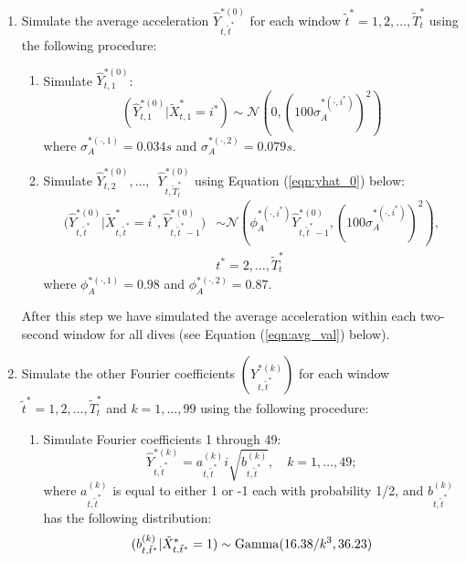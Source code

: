\begin{enumerate}
\item Simulate the average acceleration $\hat Y^{*(0)}_{t,\tilde t^*}$ for each window $\tilde t^* = 1,2,\ldots,\tilde T^*_t$ using the following procedure:
\begin{enumerate}
    \item Simulate $\hat{Y}^{*(0)}_{t,1}$:
    $$
    	(\hat{Y}^{*(0)}_{t,1}|\tilde X^*_{t,1} = i^*) \sim \mathcal{N} \left(0, \left(100\sigma_A^{*(\cdot,i^*)}\right)^2 \right)
    $$
    where $\sigma_A^{*(\cdot,1)} = 0.034s$ and $\sigma_A^{*(\cdot,2)} = 0.079s$. 
    \item Simulate $\hat{Y}^{*(0)}_{t,2}, \ldots,\enspace \hat{Y}^{*(0)}_{t,\tilde T^*_t}$ using Equation (\ref{eqn:yhat_0}) below:
    \begin{align}	
        \Big(\hat{Y}^{*(0)}_{t,\tilde t^*}|\tilde X^*_{t,\tilde t^*} = i^*,\hat{Y}^{*(0)}_{t,\tilde t^*-1}\Big) &\sim \mathcal{N} \left(\phi_A^{*(\cdot,i^*)} \hat{Y}^{*(0)}_{t,\tilde t^*-1}, \left(100\sigma_A^{*(\cdot,i^*)}\right)^2 \right), \nonumber \\
        &t^* = 2,\ldots, \tilde T^*_t
    	\label{eqn:yhat_0}
    \end{align}
    where $\phi_A^{*(\cdot,1)} = 0.98$ and $\phi_A^{*(\cdot,2)} = 0.87$. 
    \end{enumerate}
    After this step we have simulated the average acceleration within each two-second window for all dives (see Equation (\ref{eqn:avg_val}) below).
    \item Simulate the other Fourier coefficients $\left(Y^{*(k)}_{t,\tilde t^*}\right)$ for each window $\tilde t^* = 1,2,\ldots,\tilde T^*_t$ and $k = 1,\ldots,99$ using the following procedure:
    \begin{enumerate}
    \item Simulate Fourier coefficients 1 through 49:
    \begin{equation}
        \hat{Y}^{*(k)}_{t,\tilde t^*} = a_{t,\tilde t^*}^{(k)} i\sqrt{b^{(k)}_{t,\tilde t^*}}, \quad k = 1,\ldots,49;
        \label{eqn:abYhat}
    \end{equation}
    where $a^{(k)}_{t,\tilde t^*}$ is equal to either 1 or -1 each with probability 1/2, and $b^{(k)}_{t,\tilde t^*}$ has the following distribution:
    \begin{align}
    \begin{split}
    	(b^{(k)}_{t,\tilde t^*}|\tilde X^*_{t,\tilde t^*} = 1) &\sim {\rm{Gamma}}(16.38/k^3, 36.23) \\

\end{split}
\end{align}
\end{enumerate}
\end{enumerate}
